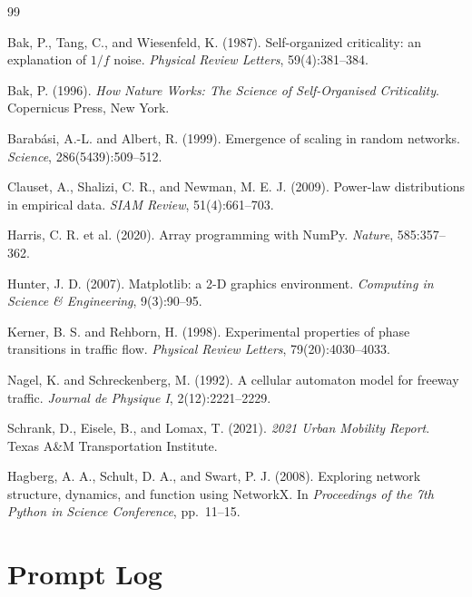 \documentclass[12pt,a4paper]{article}
\begin{document}
\begin{thebibliography}{99}

Bak, P., Tang, C., and Wiesenfeld, K. (1987).
Self-organized criticality: an explanation of $1/f$ noise.
\textit{Physical Review Letters}, 59(4):381--384.

Bak, P. (1996).
\textit{How Nature Works: The Science of Self-Organised Criticality}.
Copernicus Press, New York.

Barabási, A.-L. and Albert, R. (1999).
Emergence of scaling in random networks.
\textit{Science}, 286(5439):509--512.

Clauset, A., Shalizi, C. R., and Newman, M. E. J. (2009).
Power-law distributions in empirical data.
\textit{SIAM Review}, 51(4):661--703.

Harris, C. R. et al. (2020).
Array programming with NumPy.
\textit{Nature}, 585:357--362.

Hunter, J. D. (2007).
Matplotlib: a 2-D graphics environment.
\textit{Computing in Science \& Engineering}, 9(3):90--95.

Kerner, B. S. and Rehborn, H. (1998).
Experimental properties of phase transitions in traffic flow.
\textit{Physical Review Letters}, 79(20):4030--4033.

Nagel, K. and Schreckenberg, M. (1992).
A cellular automaton model for freeway traffic.
\textit{Journal de Physique I}, 2(12):2221--2229.

Schrank, D., Eisele, B., and Lomax, T. (2021).
\textit{2021 Urban Mobility Report}.
Texas A\&M Transportation Institute.

Hagberg, A. A., Schult, D. A., and Swart, P. J. (2008).
Exploring network structure, dynamics, and function using NetworkX.
In \textit{Proceedings of the 7th Python in Science Conference}, 
pp.\ 11--15.

\end{thebibliography}

\appendix

\section{Prompt Log}
\label{app:prompts}
\end{document}
